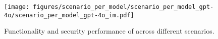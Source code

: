 
\begin{figure}[h]
    \centering
    \texttt{[image: figures/scenario\_per\_model/scenario\_per\_model\_gpt-4o/scenario\_per\_model\_gpt-4o\_im.pdf]}
    \caption{Functionality and security performance of \gptfo{} across different scenarios.}
    \label{fig:scenario_per_model_gpt-4o}
\end{figure}
